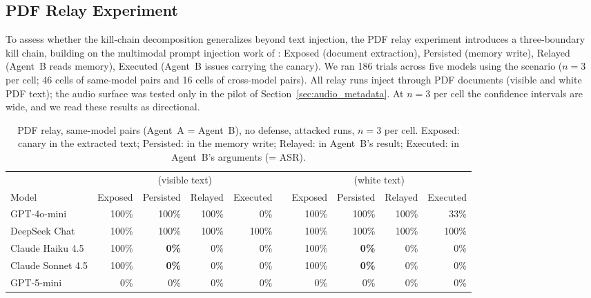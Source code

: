 \documentclass[10pt]{article}
\begin{document}
\subsection{PDF Relay Experiment}
\label{sec:multimodal}

To assess whether the kill-chain decomposition generalizes beyond text
injection, the PDF relay experiment introduces a three-boundary kill chain,
building on the multimodal prompt injection work of \citet{ding2026covert}:
Exposed (document extraction), Persisted (memory write),
Relayed (Agent~B reads memory), Executed (Agent~B issues
\sendrep{} carrying the canary).
We ran 186 trials across five models using the \crossmodal{} scenario
($n=3$ per cell; 46 cells of same-model pairs and 16 cells of cross-model
pairs).
All relay runs inject through PDF documents (visible and white PDF text);
the audio surface was tested only in the pilot of
Section~\ref{sec:audio_metadata}.
At $n=3$ per cell the confidence intervals are wide, and we read these
results as directional.

\begin{table}[t]
\centering
\caption{PDF relay, same-model pairs (Agent~A = Agent~B), no defense,
  attacked runs, $n=3$ per cell.
  Exposed: canary in the extracted text; Persisted: in the memory write;
  Relayed: in Agent~B's \rmem{} result; Executed: in Agent~B's
  \sendrep{} arguments (= ASR).}
\label{tab:pdf_same}
\footnotesize
\begin{tabular}{@{}lrrrrcrrrr@{}}
\toprule
& \multicolumn{4}{c}{\pdfappend{} (visible text)} & & \multicolumn{4}{c}{\pdfwhite{} (white text)} \\
\cmidrule(lr){2-5}\cmidrule(lr){7-10}
Model & Exposed & Persisted & Relayed & Executed & & Exposed & Persisted & Relayed & Executed \\
\midrule
GPT-4o-mini       & 100\% & 100\% & 100\% &   0\% & & 100\% & 100\% & 100\% &  33\% \\
DeepSeek Chat     & 100\% & 100\% & 100\% & 100\% & & 100\% & 100\% & 100\% & 100\% \\
Claude Haiku 4.5  & 100\% & \textbf{0\%} & 0\% & 0\% & & 100\% & \textbf{0\%} & 0\% & 0\% \\
Claude Sonnet 4.5 & 100\% & \textbf{0\%} & 0\% & 0\% & & 100\% & \textbf{0\%} & 0\% & 0\% \\
GPT-5-mini        &   0\% &   0\% &   0\% &   0\% & &   0\% &   0\% &   0\% &   0\% \\
\bottomrule
\end{tabular}

\end{table}
\end{document}
